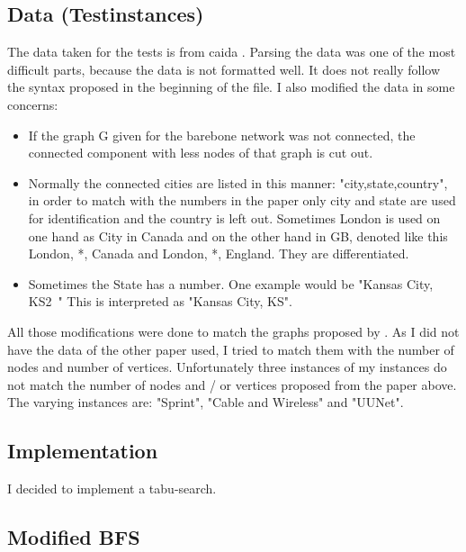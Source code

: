 \documentclass [12pt]{article}
\begin{document}
\subsection{Data (Testinstances)}
The data taken for the tests is from caida \cite{caidabarebones}. Parsing the
data was one of the most difficult parts, because the data is not formatted well.
It does not really follow the syntax proposed in the beginning of the file. I also
modified the data in some concerns:
\begin{itemize}
    \item If the graph G given for the barebone network was not connected,
        the connected component with less nodes of that graph is cut out.

    \item Normally the connected cities are listed in this manner:
        "city,state,country", in order to match with the numbers 
        in the paper \cite{mirrorserver} only city and state are used for
        identification and the country is left out. Sometimes London
        is used on one hand as City in Canada and on the other hand in GB, denoted like this
        London, *, Canada and London, *, England. They are differentiated.
    \item Sometimes the State has a number. One example would be "Kansas City, KS2~"
        This is interpreted as "Kansas City, KS".

\end{itemize}

All those modifications were done to match the graphs proposed by \cite{mirrorserver}.
As I did not have the data of the other paper used, I tried to match them with the number of
nodes and number of vertices. Unfortunately three instances of my instances do not
match the number of nodes and / or vertices proposed from the paper above.
The varying instances are: "Sprint", "Cable and Wireless" and "UUNet".

\subsection{Implementation}
I decided to implement a tabu-search.
    \subsection{Modified BFS}
\end{document}
